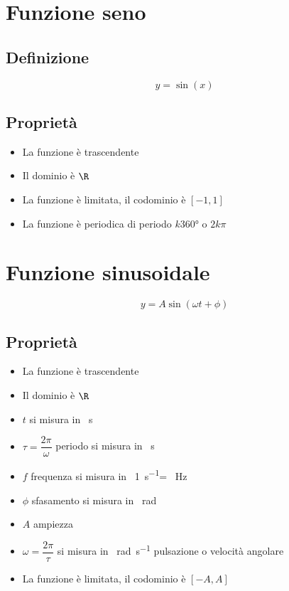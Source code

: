 \chapter{Funzione seno}
\section{Definizione}
\begin{equation}
y=\sin(x)
\end{equation}
\section{Proprietà}
\begin{itemize}
	\item La funzione è trascendente
\item Il dominio è $\R$
\item La funzione è limitata, il codominio è $[-1,1]$
\item La funzione è periodica di periodo $k\ang{360;;}$ o $2k\pi$
\end{itemize}
\begin{center}
	
\end{center}
\chapter{Funzione sinusoidale}
\begin{equation}
y=A\sin(\omega t+\phi)
\end{equation}
\section{Proprietà}
\begin{itemize}
	\item La funzione è trascendente
	\item Il dominio è $\R$
	\item $t$ si misura  in \SI[parse-numbers=false]{}{\second}
	\item $\tau=\dfrac{2\pi}{\omega}$ periodo si misura  in \SI[parse-numbers=false]{}{\second}
	\item $f$ frequenza si misura in  \SI[parse-numbers=false]{}{1\per\second}= \SI[parse-numbers=false]{}{\hertz}
	\item $\phi$ sfasamento si misura in \SI[parse-numbers=false]{}{\radian}
\item $A$ ampiezza
\item $\omega=\dfrac{2\pi}{\tau}$ si misura in  \SI[parse-numbers=false]{}{\radian\per\second} pulsazione o velocità angolare 
	\item La funzione è limitata, il codominio è $[-A,A]$
\end{itemize}